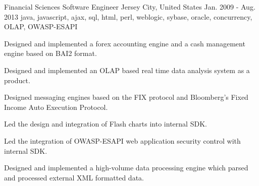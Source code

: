 \cventry
    {Financial Sciences} %
    {Software Engineer} %
    {Jersey City, United States} %
    {Jan. 2009 - Aug. 2013} %
    {java, javascript, ajax, sql, html, perl, weblogic, sybase, oracle, concurrency, OLAP, OWASP-ESAPI} %
    {
    \begin{cvitems} %
        \item { Designed and implemented a forex accounting engine and a cash management engine based on BAI2 format. }
        \item { Designed and implemented an OLAP based real time data analysis system as a product. }
        \item { Designed messaging engines based on the FIX protocol and Bloomberg's Fixed Income Auto Execution Protocol. }
        \item { Led the design and integration of Flash charts into internal SDK. }
        \item { Led the integration of OWASP-ESAPI web application security control with internal SDK.}
        \item { Designed and implemented a high-volume data processing engine which parsed and processed external XML formatted data.}
    \end{cvitems}
    }
    